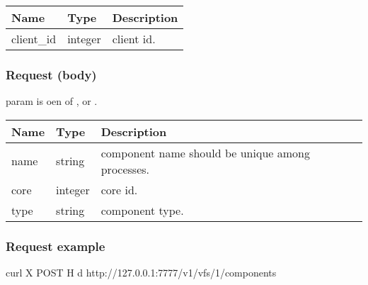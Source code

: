 \documentclass[a4paper,11pt,openany,oneside,english]{sphinxmanual}
\begin{document}
\begin{savenotes}\sphinxattablestart
\centering
{}
\sphinxthecaptionisattop
{}\label{\detokenize{api_ref/spp_vf:id25}}\label{\detokenize{api_ref/spp_vf:table-spp-ctl-spp-vf-components}}
\sphinxaftertopcaption
\begin{tabulary}{\linewidth}[t]{|T|T|T|}
\hline
\sphinxstyletheadfamily 
Name
&\sphinxstyletheadfamily 
Type
&\sphinxstyletheadfamily 
Description
\\
\hline
client\_id
&
integer
&
client id.
\\
\hline
\end{tabulary}
\par
\sphinxattableend\end{savenotes}


\subsubsection{Request (body)}
\label{\detokenize{api_ref/spp_vf:request-body}}
 param is oen of ,  or .


\begin{savenotes}\sphinxattablestart
\centering
{}
\sphinxthecaptionisattop
{}\label{\detokenize{api_ref/spp_vf:id26}}\label{\detokenize{api_ref/spp_vf:table-spp-ctl-spp-vf-components-res}}
\sphinxaftertopcaption
\begin{tabulary}{\linewidth}[t]{|T|T|T|}
\hline
\sphinxstyletheadfamily 
Name
&\sphinxstyletheadfamily 
Type
&\sphinxstyletheadfamily 
Description
\\
\hline
name
&
string
&
component name should be unique among processes.
\\
\hline
core
&
integer
&
core id.
\\
\hline
type
&
string
&
component type.
\\
\hline
\end{tabulary}
\par
\sphinxattableend\end{savenotes}


\subsubsection{Request example}
\label{\detokenize{api_ref/spp_vf:id2}}
\begin{sphinxVerbatim}[commandchars=\\\{\},formatcom=\footnotesize]
 curl \PYGZhy{}X POST \PYGZhy{}H  
  \PYGZhy{}d  
  http://127.0.0.1:7777/v1/vfs/1/components
\end{sphinxVerbatim}
\end{document}
